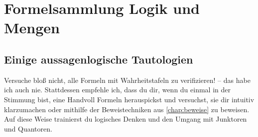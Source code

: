 \begin{comment}
    \item[\cite{Bra17}] \textbf{M. Brandenburg: Einführung in die Kategorientheorie.} Wo wir bei größeren Strukturen sind: das Werkzeug par excellence, Ordnung im Kopf zu schaffen und Brücken zwischen den Vorlesungen zu schlagen, ist die Kategorientheorie, deren bestes deutschsprachiges Lehrbuch dasjenige von Martin Brandenburg ist. Jedoch ist Kategorientheorie, bis auf einige Grundbegriffe, nicht Erstsemester-gerecht und in ihrem hohen Grad an Abstraktion erst verständlich, sobald man bereits einen ausgedehnten Begriffs- und Beispielhorizont besitzt. Nichtsdestotrotz solltest du versuchen, Kategorientheorie so früh wie möglich zu lernen, am besten vielleicht begleitend zu den Vorlesungen Algebra 1, Algebraische Topologie oder Mengentheoretische Topologie im dritten Semester.

    \item[\cite{Dei}] \textbf{O. Deiser: Einführung in die Mengenlehre.} Ein anfängergerechter Rundgang durch die Mengenlehre, besonders zu empfehlen aufgrund der vielen historischen Bemerkungen und Zitate von Originalarbeiten. Leidet jedoch unter der Mengentheoretiker-Krankheit, sich hier und da in esoterischen Schwafeleien zu verzetteln oder auf neurotisch-überformaler Notation zu beharren. An einigen Stellen finde ich es in seinem Zugang irreführend, sodass es weniger als Einstiegslektüre, besser als Begleitlektüre gelesen werden sollte. Vom oft empfohlenen Standardwerk von Ebbinghaus rate ich ab, vielleicht solltest du dich zur Mengenlehre besser in der englischsprachigen Literatur umsehen.
\end{enumerate}
\end{comment}





\chapter{Formelsammlung Logik und Mengen} \label{anhang:formelsammlung}


\section{Einige aussagenlogische Tautologien}
Versuche bloß nicht, alle Formeln mit Wahrheitstafeln zu verifizieren! -- das habe ich auch nie. Stattdessen empfehle ich, dass du dir, wenn du einmal in der Stimmung bist, eine Handvoll Formeln herauspickst und versuchst, sie dir intuitiv klarzumachen oder mithilfe der Beweistechniken aus \cref{chap:beweise} zu beweisen. Auf diese Weise trainierst du logisches Denken und den Umgang mit Junktoren und Quantoren.

